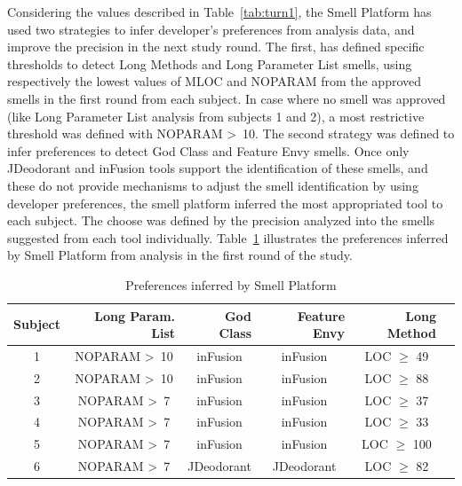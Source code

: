 \documentclass[conference]{IEEEtran}
\begin{document}
Considering the values described in Table~\ref{tab:turn1}, the Smell Platform has used two strategies to infer developer's preferences from analysis data, and improve the precision in the next study round. The first, has defined specific thresholds to detect Long Methods and Long Parameter List smells, using respectively the lowest values of MLOC and NOPARAM from the approved smells in the first round from each subject. In case where no smell was approved (like Long Parameter List analysis from subjects 1 and 2), a most restrictive threshold was defined with NOPARAM \textgreater~10. The second strategy was defined to infer preferences to detect God Class and Feature Envy smells. Once only JDeodorant and inFusion tools support the identification of these smells, and these do not provide mechanisms to adjust the smell identification by using developer preferences, the smell platform inferred the most appropriated tool to each subject. The choose was defined by the precision analyzed into the smells suggested from each tool individually. Table~\ref{tab:strategies} illustrates the preferences inferred by Smell Platform from analysis in the first round of the study.

\begin{table}[h]
\centering
\caption{Preferences inferred by Smell Platform}
\label{tab:strategies}
\begin{tabular}{cccccc}
\hline
Subject & \multicolumn{1}{r}{Long Param. List}       & \multicolumn{1}{r}{God Class}          & \multicolumn{1}{r}{Feature Envy}           & \multicolumn{1}{r}{Long Method}  \\ \hline
1        & \multicolumn{1}{c}{NOPARAM \textgreater~10} & \multicolumn{1}{c}{inFusion} & \multicolumn{1}{c}{inFusion} & LOC $\geq$ 49 \\ 
2        & NOPARAM \textgreater~10         & inFusion                      & inFusion                       & LOC $\geq$ 88 \\ 
3        & NOPARAM \textgreater~7          & inFusion                      & inFusion                       & LOC $\geq$ 37  \\ 
4        & NOPARAM \textgreater~7          & inFusion                      & inFusion                       & LOC $\geq$ 33  \\ 
5        & NOPARAM \textgreater~7          & inFusion                      & inFusion                       & LOC $\geq$ 100  \\ 
6        & NOPARAM \textgreater~7          & JDeodorant                    & JDeodorant                     & LOC $\geq$ 82  \\ 
\hline
\end{tabular}
\end{table}
\end{document}
